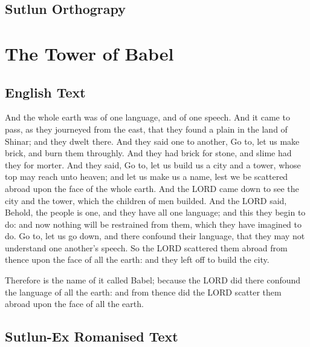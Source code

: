 \documentclass{book}
\begin{document}
\section{Sutlun Orthograpy}


\chapter{The Tower of Babel}
\section{English Text}

    And the whole earth was of one language, and of one speech.
    And it came to pass, as they journeyed from the east, that they found a plain in the land of Shinar;
    and they dwelt there.
    And they said one to another, Go to, let us make brick, and burn them throughly.
    And they had brick for stone, and slime had they for morter.
    And they said, Go to, let us build us a city and a tower, whose top may reach unto heaven;
    and let us make us a name, lest we be scattered abroad upon the face of the whole earth.
    And the LORD came down to see the city and the tower, which the children of men builded.
    And the LORD said, Behold, the people is one, and they have all one language; and this they begin to do:
    and now nothing will be restrained from them, which they have imagined to do.
    Go to, let us go down, and there confound their language, that they may not understand one another's speech.
    So the LORD scattered them abroad from thence upon the face of all the earth: and they left off to build the city.

    Therefore is the name of it called Babel; because the LORD did there confound the language of all the earth:
    and from thence did the LORD scatter them abroad upon the face of all the earth.

\section{Sutlun-Ex Romanised Text}
\end{document}
